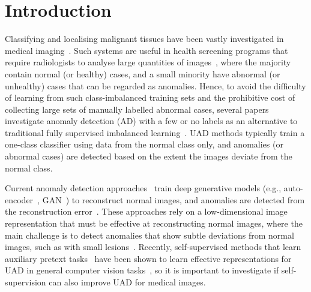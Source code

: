 \documentclass[runningheads]{llncs}
\begin{document}
\section{Introduction}
\label{sec:introduction}

Classifying and localising malignant tissues have been vastly investigated in medical imaging~\cite{tian2019one,tian2020few,liuphotoshopping,litjens2017survey,baur2020scale,fan2020pranet,lz2020computer,liu2021self,liu2021noisy}.
Such systems are useful in health screening programs that require radiologists to analyse large quantities of images~\cite{tian2021detecting,pu2019prospective}, where the majority contain normal (or healthy) cases, and a small minority have abnormal (or unhealthy) cases that can be regarded as anomalies.
Hence, to avoid the difficulty of learning from such class-imbalanced training sets and the prohibitive cost of collecting large sets of manually labelled abnormal cases, several papers investigate anomaly detection (AD) with a few or no labels as an alternative to traditional fully supervised imbalanced learning~\cite{liuphotoshopping,baur2020scale,F-anoGAN,seebock2019exploiting,tian2021weakly,luo2020encoding,tian2020few,pang2021deep,uzunova2019unsupervised,ouardini2019towards}.
UAD methods typically train a one-class classifier using data from the normal class only, and anomalies (or abnormal cases) are detected based on the extent the images deviate from the normal class. 







Current anomaly detection approaches~\cite{F-anoGAN,gong2019memorizing,chen2021unsupervised,liu2019photoshopping,tian2020few,venkataramanan2020attention,chen2020unsupervised} train deep generative models (e.g., auto-encoder~\cite{kingma2013auto}, GAN~\cite{goodfellow2014generative}) to reconstruct normal images, 
and anomalies are detected from the reconstruction error~\cite{pang2021deep}.
These approaches rely on a low-dimensional image representation that must be effective at reconstructing normal images, where the main challenge is to detect anomalies that show subtle deviations from normal images, such as with small lesions~\cite{tian2020few}. Recently, self-supervised methods that learn auxiliary pretext tasks~\cite{hendrycks2019using,golan2018deep,bergman2020classification,simclr,moco,liu2020self}
have been shown to learn effective representations for UAD in general computer vision tasks~\cite{hendrycks2019using,golan2018deep,bergman2020classification}, so it is important to investigate if self-supervision can also improve UAD for medical images. 
\end{document}

